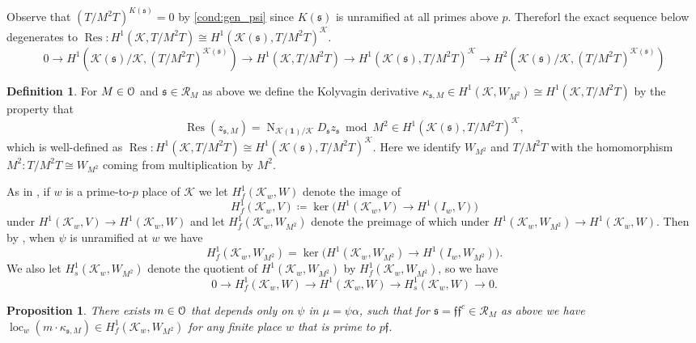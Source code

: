 \documentclass[leqno]{amsart}
\newtheorem{prop}[thm]{Proposition}
\theoremstyle{definition}
\newtheorem{defn}[thm]{Definition}
\theoremstyle{remark}
\newcommand{\id}{\mathbf{1}}
\newcommand{\eo}{\EuScript{O}}
\DeclareMathOperator{\Nr}{N}
\DeclareMathOperator{\Res}{Res}
\newcommand{\ff}{\mathfrak{f}}
\newcommand{\fs}{\mathfrak{s}}
\newcommand{\K}{{\mathcal{K}}} %
\DeclareMathOperator{\loc}{loc}
\begin{document}
Observe that $(T/{M^2}T)^{K(\fs)}=0$ by \eqref{cond:gen_psi}
since $K(\fs)$ is unramified at all primes above $p$. 
Thereforl the exact sequence below degenerates to 
$\Res\colon H^1(\K, T/{M^2}T)\cong H^1(\K(\fs), T/{M^2}T)^{\K}$.
\[
	0\to H^1(\K(\fs)/\K, (T/{M^2}T)^{\K(\fs)})\to
	H^1(\K, T/{M^2}T)\to
	H^1(\K(\fs), T/{M^2}T)^{\K}\to
	H^2(\K(\fs)/\K, (T/{M^2}T)^{\K(\fs)})
\]

\begin{defn}
For $M\in \eo$ and $\fs\in\mathcal{R}_M$ as above
we define the Kolyvagin derivative 
$\kappa_{\fs,M}\in H^1(\K,W_{M^2})\cong H^1(\K,T/{M^2}T)$
by the property that 
\[
    \Res(z_{\fs,M})=\Nr_{\K(\id)/\K}D_{\fs}z_{\fs} \bmod M^2\in 
    H^1(\K(\fs), T/{M^2}T)^{\K},
\]
which is well-defined as
$\Res\colon H^1(\K, T/{M^2}T)\cong H^1(\K(\fs), T/{M^2}T)^{\K}$.
Here we identify $W_{M^2}$ and $T/M^2T$ 
with the homomorphism $M^2\colon T/M^2T\cong W_{M^2}$
coming from multiplication by $M^2$.
\end{defn}


As in \cite[Def 1.3.4]{Rubin},
if $w$ is a prime-to-$p$ place of $\K$
we let $H^1_f(\K_w,W)$
denote the image of 
\[
    H^1_f(\K_w,V)\coloneqq
    \ker\big(H^1(\K_w,V)\to H^1(I_w, V)\big)
\]
under $H^1(\K_w,V)\to H^1(\K_w, W)$
and let $H^1_f(\K_w,W_{M^2})$ denote the preimage of which
under $H^1(\K_w,W_{M^2})\to H^1(\K_w, W)$. 
Then by \cite[Lem 1.3.8]{Rubin},
when $\psi$ is unramified at $w$ we have
\begin{equation}\label{eq:f_un}
    H^1_f(\K_w,W_{M^2})=
    \ker\big(H^1(\K_w,W_{M^2})\to H^1(I_w, W_{M^2})\big).
\end{equation}
We also let $H^1_s(\K_w,W_{M^2})$
denote the quotient of $H^1(\K_w,W_{M^2})$ by $H^1_f(\K_w,W_{M^2})$,
so we have 
\[
    0\to H^1_f(\K_w,W)\to H^1(\K_w,W)\to H^1_s(\K_w,W)\to 0.
\]




\begin{prop}\label{prop:goodm}
There exists $m\in \eo$
that depends only on $\psi$ in $\mu=\psi\alpha$, such that 
for $\fs=\ff\ff^c\in \mathcal{R}_M$ as above we have
$\loc_w(m\cdot \kappa_{\fs,M})\in H^1_f(\K_w,W_{M^2})$
for any finite place $w$ that is prime to $p\ff$.
\end{prop}
\end{document}

